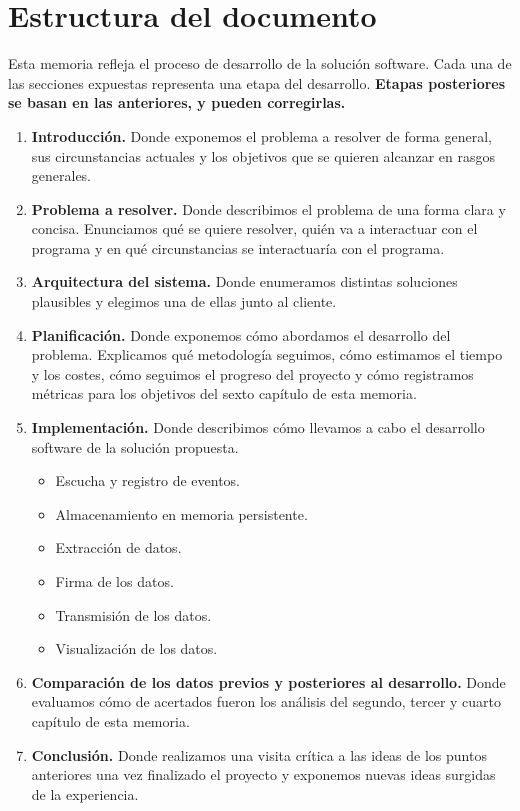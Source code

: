 \section{Estructura del documento}

Esta memoria refleja el proceso de desarrollo de la solución software.
Cada una de las secciones expuestas representa una etapa del desarrollo.
\textbf{Etapas posteriores se basan en las anteriores, y pueden corregirlas.}

\begin{enumerate}
    \item \textbf{Introducción.} Donde exponemos el problema a resolver de forma general,
    sus circunstancias actuales y los objetivos que se quieren alcanzar en rasgos generales.

    \item \textbf{Problema a resolver.} Donde describimos el problema de una forma clara y concisa.
    Enunciamos qué se quiere resolver, quién va a interactuar con el programa y en qué circunstancias
    se interactuaría con el programa.

    \item \textbf{Arquitectura del sistema.} Donde enumeramos distintas soluciones plausibles
    y elegimos una de ellas junto al cliente.

    \item \textbf{Planificación.} Donde exponemos cómo abordamos el desarrollo del problema.
    Explicamos qué metodología seguimos, cómo estimamos el tiempo y los costes, cómo seguimos el progreso
    del proyecto y cómo registramos métricas para los objetivos del sexto capítulo de esta memoria.

    \item \textbf{Implementación.} Donde describimos cómo llevamos a cabo el desarrollo software
    de la solución propuesta.
    \begin{itemize}
        \item Escucha y registro de eventos.
        \item Almacenamiento en memoria persistente.
        \item Extracción de datos.
        \item Firma de los datos.
        \item Transmisión de los datos.
        \item Visualización de los datos.
    \end{itemize}

    \item \textbf{Comparación de los datos previos y posteriores al desarrollo.} Donde evaluamos cómo de
    acertados fueron los análisis del segundo, tercer y cuarto capítulo de esta memoria.

    \item \textbf{Conclusión.} Donde realizamos una visita crítica a las ideas de los puntos
    anteriores una vez finalizado el proyecto y exponemos nuevas ideas surgidas de la experiencia.
\end{enumerate}
